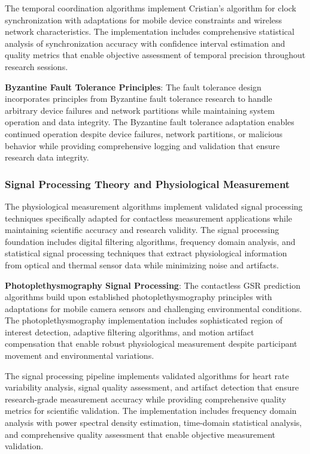\documentclass[12pt,a4paper]{article}
\begin{document}
The temporal coordination algorithms implement Cristian's algorithm for clock synchronization with adaptations for
mobile device constraints and wireless network characteristics. The implementation includes comprehensive statistical
analysis of synchronization accuracy with confidence interval estimation and quality metrics that enable objective
assessment of temporal precision throughout research sessions.

\textbf{Byzantine Fault Tolerance Principles}: The fault tolerance design incorporates principles from Byzantine fault
tolerance research to handle arbitrary device failures and network partitions while maintaining system operation and
data integrity. The Byzantine fault tolerance adaptation enables continued operation despite device failures, network
partitions, or malicious behavior while providing comprehensive logging and validation that ensure research data
integrity.

\subsubsection{Signal Processing Theory and Physiological Measurement}

The physiological measurement algorithms implement validated signal processing techniques specifically adapted for
contactless measurement applications while maintaining scientific accuracy and research validity. The signal processing
foundation includes digital filtering algorithms, frequency domain analysis, and statistical signal processing
techniques that extract physiological information from optical and thermal sensor data while minimizing noise and
artifacts.

\textbf{Photoplethysmography Signal Processing}: The contactless GSR prediction algorithms build upon established
photoplethysmography principles with adaptations for mobile camera sensors and challenging environmental conditions. The
photoplethysmography implementation includes sophisticated region of interest detection, adaptive filtering algorithms,
and motion artifact compensation that enable robust physiological measurement despite participant movement and
environmental variations.

The signal processing pipeline implements validated algorithms for heart rate variability analysis, signal quality
assessment, and artifact detection that ensure research-grade measurement accuracy while providing comprehensive quality
metrics for scientific validation. The implementation includes frequency domain analysis with power spectral density
estimation, time-domain statistical analysis, and comprehensive quality assessment that enable objective measurement
validation.
\end{document}
